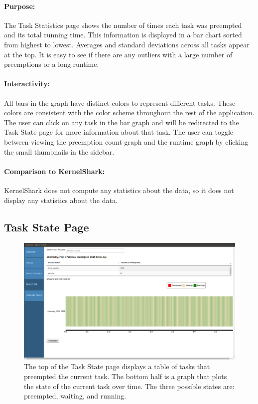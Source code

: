 \documentclass{hmcclinic}
\begin{document}
\paragraph{Purpose:}
The Task Statistics page shows the number of times each task was preempted and
its total running time. This information is displayed in a bar chart sorted from
highest to lowest. Averages and standard deviations across all tasks appear at the
top. It is easy to see if there are any outliers with a large number of
preemptions or a long runtime.

\paragraph{Interactivity:}
All bars in the graph have distinct colors to represent different tasks. These
colors are consistent with the color scheme throughout the rest of the
application. The user can click on any task in the bar graph and will be
redirected to the Task State page for more information about that task.
The user can toggle between viewing the preemption count graph and the runtime
graph by clicking the small thumbnails in the sidebar.

\paragraph{Comparison to KernelShark:} KernelShark does not compute any
statistics about the data, so it does not display any statistics about the data.


  \subsection{Task State Page}

  \begin{figure}[H]
  \includegraphics[scale=0.3]{task-state-page.png}
  \caption{The top of the Task State page displays a table of tasks
  that preempted the current task. The bottom half is a graph that plots the
state of the current task over time. The three possible states are: preempted,
waiting, and running.}
\end{figure}
\end{document}
